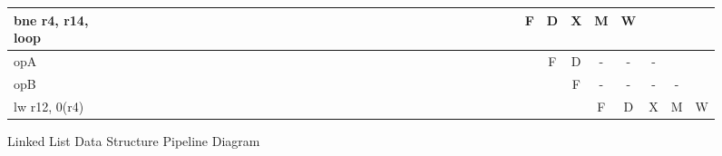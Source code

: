 \documentclass[10pt]{article}
\begin{document}
\begin{landscape}
\begin{figure}[H]
{\begin{tabular}{|l|c|c|c|c!{\vrule width 1.5pt}c|c|c|c|c|c|c|c|c|c|c|c|c|c|c|c|c|c!{\vrule width 1.5pt}c|c|c|c|c|c|c|c|c|c|c|c|c|c|c|c|c|c!{\vrule width 1.5pt}c|}
bne r4, r14, loop &   &   &   &   &   &   &   &   &   &    &    &    &    &    &    &    &    &    &    &    &    &    &    &    &    &    &    &    &    &    &    &    &    & F  & D  & X  & M  & W  &    &    &    \\ \hline
opA               &   &   &   &   &   &   &   &   &   &    &    &    &    &    &    &    &    &    &    &    &    &    &    &    &    &    &    &    &    &    &    &    &    &    & F  & D  & -  & -  & -  &    &    \\ \hline
opB               &   &   &   &   &   &   &   &   &   &    &    &    &    &    &    &    &    &    &    &    &    &    &    &    &    &    &    &    &    &    &    &    &    &    &    & F  & -  & -  & -  & -  &    \\ \hline
lw r12, 0(r4)     &   &   &   &   &   &   &   &   &   &    &    &    &    &    &    &    &    &    &    &    &    &    &    &    &    &    &    &    &    &    &    &    &    &    &    &    & F  & D  & X  & M  & W  \\ \hline
\end{tabular}
}
\caption{Linked List Data Structure Pipeline Diagram}
\end{figure}
\end{landscape}
\end{document}
